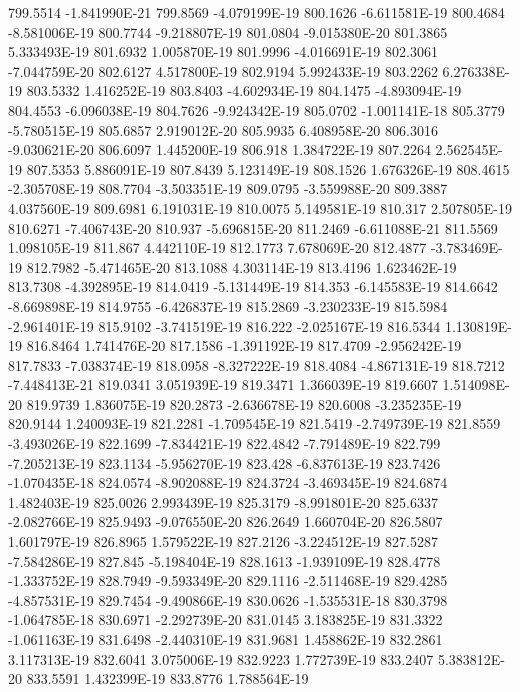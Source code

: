 799.5514  -1.841990E-21
799.8569  -4.079199E-19
800.1626  -6.611581E-19
800.4684  -8.581006E-19
800.7744  -9.218807E-19
801.0804  -9.015380E-20
801.3865  5.333493E-19
801.6932  1.005870E-19
801.9996  -4.016691E-19
802.3061  -7.044759E-20
802.6127  4.517800E-19
802.9194  5.992433E-19
803.2262  6.276338E-19
803.5332  1.416252E-19
803.8403  -4.602934E-19
804.1475  -4.893094E-19
804.4553  -6.096038E-19
804.7626  -9.924342E-19
805.0702  -1.001141E-18
805.3779  -5.780515E-19
805.6857  2.919012E-20
805.9935  6.408958E-20
806.3016  -9.030621E-20
806.6097  1.445200E-19
806.918  1.384722E-19
807.2264  2.562545E-19
807.5353  5.886091E-19
807.8439  5.123149E-19
808.1526  1.676326E-19
808.4615  -2.305708E-19
808.7704  -3.503351E-19
809.0795  -3.559988E-20
809.3887  4.037560E-19
809.6981  6.191031E-19
810.0075  5.149581E-19
810.317  2.507805E-19
810.6271  -7.406743E-20
810.937  -5.696815E-20
811.2469  -6.611088E-21
811.5569  1.098105E-19
811.867  4.442110E-19
812.1773  7.678069E-20
812.4877  -3.783469E-19
812.7982  -5.471465E-20
813.1088  4.303114E-19
813.4196  1.623462E-19
813.7308  -4.392895E-19
814.0419  -5.131449E-19
814.353  -6.145583E-19
814.6642  -8.669898E-19
814.9755  -6.426837E-19
815.2869  -3.230233E-19
815.5984  -2.961401E-19
815.9102  -3.741519E-19
816.222  -2.025167E-19
816.5344  1.130819E-19
816.8464  1.741476E-20
817.1586  -1.391192E-19
817.4709  -2.956242E-19
817.7833  -7.038374E-19
818.0958  -8.327222E-19
818.4084  -4.867131E-19
818.7212  -7.448413E-21
819.0341  3.051939E-19
819.3471  1.366039E-19
819.6607  1.514098E-20
819.9739  1.836075E-19
820.2873  -2.636678E-19
820.6008  -3.235235E-19
820.9144  1.240093E-19
821.2281  -1.709545E-19
821.5419  -2.749739E-19
821.8559  -3.493026E-19
822.1699  -7.834421E-19
822.4842  -7.791489E-19
822.799  -7.205213E-19
823.1134  -5.956270E-19
823.428  -6.837613E-19
823.7426  -1.070435E-18
824.0574  -8.902088E-19
824.3724  -3.469345E-19
824.6874  1.482403E-19
825.0026  2.993439E-19
825.3179  -8.991801E-20
825.6337  -2.082766E-19
825.9493  -9.076550E-20
826.2649  1.660704E-20
826.5807  1.601797E-19
826.8965  1.579522E-19
827.2126  -3.224512E-19
827.5287  -7.584286E-19
827.845  -5.198404E-19
828.1613  -1.939109E-19
828.4778  -1.333752E-19
828.7949  -9.593349E-20
829.1116  -2.511468E-19
829.4285  -4.857531E-19
829.7454  -9.490866E-19
830.0626  -1.535531E-18
830.3798  -1.064785E-18
830.6971  -2.292739E-20
831.0145  3.183825E-19
831.3322  -1.061163E-19
831.6498  -2.440310E-19
831.9681  1.458862E-19
832.2861  3.117313E-19
832.6041  3.075006E-19
832.9223  1.772739E-19
833.2407  5.383812E-20
833.5591  1.432399E-19
833.8776  1.788564E-19
